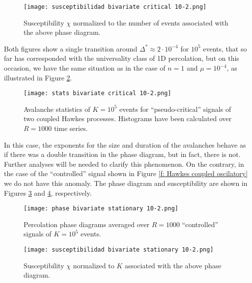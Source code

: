 \begin{figure}[H]
    \centering
    \texttt{[image: susceptibilidad bivariate critical 10-2.png]}
    \caption{Susceptibility $\chi$ normalized to the number of events associated with the above phase diagram.}
    \label{f:susceptibilidad_coupled critical}
\end{figure}

Both figures show a single transition around $\Delta^*\approx 2\cdot 10^{-4}$ for $10^5$ events, that so far has corresponded with the universality class of 1D percolation, but on this occasion, we have the same 
situation as in the case of $n=1$ and $\mu=10^{-4}$, as illustrated in Figure \ref{f: stats pseudocritical}.

\begin{figure}[H]
    \centering
    \texttt{[image: stats bivariate critical 10-2.png]}
    \caption{Avalanche statistics of $K=10^5$ events for ``pseudo-critical'' signals of two coupled Hawkes processes. Histograms have been calculated over $R=1000$ time series.}
    \label{f: stats pseudocritical}
\end{figure}

In this case, the exponents for the size and duration of the avalanches behave as if there was a double transition in the phase diagram, but in fact, there is not. Further analyses will be needed
to clarify this phenomenon. On the contrary, in the case of 
the ``controlled'' signal shown in Figure \ref{f: Hawkes coupled oscilatory} we do not have this anomaly. The phase diagram and susceptibility are shown in Figures 
\ref{f:phase_diagram_coupled oscilatory} and \ref{f:susceptibilidad_coupled oscilatory}, respectively.

\begin{figure}[H]
    \centering
    \texttt{[image: phase bivariate stationary 10-2.png]}
    \caption{Percolation phase diagrams averaged over $R=1000$ ``controlled'' signals of $K=10^5$ events.}
    \label{f:phase_diagram_coupled oscilatory}
\end{figure}

\begin{figure}[H]
    \centering
    \texttt{[image: susceptibilidad bivariate stationary 10-2.png]}
    \caption{Susceptibility $\chi$ normalized to $K$ associated with the above phase diagram.}
    \label{f:susceptibilidad_coupled oscilatory}
\end{figure}

